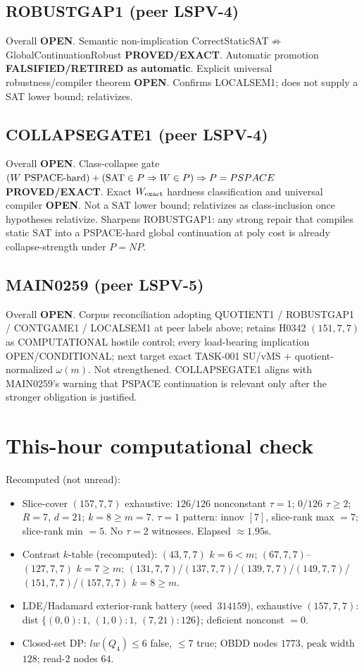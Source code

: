 \documentclass[11pt]{article}
\begin{document}
\subsection*{ROBUSTGAP1 (peer LSPV-4)}
Overall \textbf{OPEN}. Semantic non-implication CorrectStaticSAT$\not\Rightarrow$GlobalContinuationRobust
\textbf{PROVED/EXACT}. Automatic promotion \textbf{FALSIFIED/RETIRED as automatic}.
Explicit universal robustness/compiler theorem \textbf{OPEN}. Confirms LOCALSEM1;
does not supply a SAT lower bound; relativizes.

\subsection*{COLLAPSEGATE1 (peer LSPV-4)}
Overall \textbf{OPEN}. Class-collapse gate
$(W\text{ PSPACE-hard})+({\rm SAT}\in P\Rightarrow W\in P)\Rightarrow P=PSPACE$
\textbf{PROVED/EXACT}. Exact $W_{\rm exact}$ hardness classification and universal compiler
\textbf{OPEN}. Not a SAT lower bound; relativizes as class-inclusion once hypotheses relativize.
Sharpens ROBUSTGAP1: any strong repair that compiles static SAT into a PSPACE-hard global
continuation at poly cost is already collapse-strength under $P=NP$.

\subsection*{MAIN0259 (peer LSPV-5)}
Overall \textbf{OPEN}. Corpus reconciliation adopting QUOTIENT1 / ROBUSTGAP1 / CONTGAME1 /
LOCALSEM1 at peer labels above; retains H0342 $(151,7,7)$ as COMPUTATIONAL hostile control;
every load-bearing implication OPEN/CONDITIONAL; next target exact TASK-001 SU/vMS +
quotient-normalized $\omega(m)$. Not strengthened. COLLAPSEGATE1 aligns with MAIN0259's
warning that PSPACE continuation is relevant only after the stronger obligation is justified.

\section*{This-hour computational check}
Recomputed (not unread):
\begin{itemize}
\item Slice-cover $(157,7,7)$ exhaustive: $126/126$ nonconstant $\tau{=}1$;
  $0/126$ $\tau{\ge}2$; $R{=}7$, $d{=}21$; $k{=}8{\ge}m{=}7$.
  $\tau{=}1$ pattern: innov $[7]$, slice-rank max $=7$; slice-rank min $=5$.
  No $\tau{=}2$ witnesses. Elapsed $\approx1.95$s.
\item Contrast $k$-table (recomputed): $(43,7,7)$ $k{=}6{<}m$;
  $(67,7,7)$--$(127,7,7)$ $k{=}7{\ge}m$;
  $(131,7,7)$/$(137,7,7)$/$(139,7,7)$/$(149,7,7)$/$(151,7,7)$/$(157,7,7)$ $k{=}8{\ge}m$.
\item LDE/Hadamard exterior-rank battery (seed~$314159$), exhaustive $(157,7,7)$:
  dist $\{(0,0){:}1,\,(1,0){:}1,\,(7,21){:}126\}$; deficient nonconst $=0$.
\item Closed-set DP: $lw(Q_4)\le6$ false, $\le7$ true; OBDD nodes $1773$, peak width $128$;
  read-$2$ nodes $64$.
\end{itemize}
\end{document}

